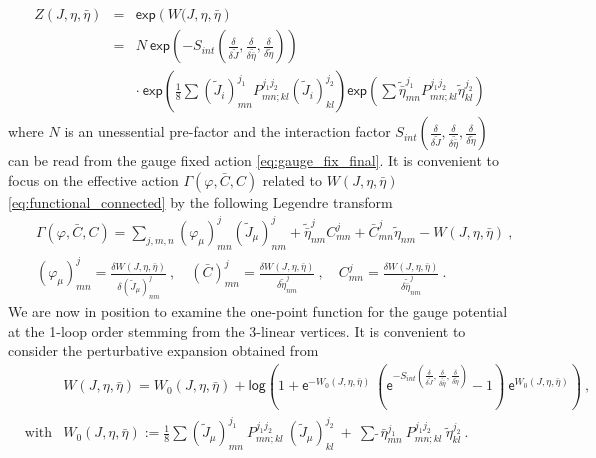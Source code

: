 \documentclass[11pt]{book}
\renewcommand{\exp}{\mathsf{exp}}
\renewcommand{\log}{\mathsf{log}}
\newcommand{\esf}{\mathsf{e}}
\theoremstyle{break}
\begin{document}
%
\begin{eqnarray}
Z(J,\eta,\bar\eta) 
&=& \exp\left(W(J,\eta,\bar\eta\right) \nonumber \\
&=& N \ \exp\left( - S_{int}\left( \frac{\delta}{\delta \widetilde{J}}, \frac{\delta}{\delta\widetilde{\bar{\eta}}}, \frac{\delta}{\delta\widetilde{\eta}} \right) \right) \nonumber \\
&& \cdot \ 
\exp\left( \frac{1}{8}\sum(\widetilde J_i)^{j_1}_{mn}P^{j_1 j_2}_{mn;kl} (\widetilde J_i)^{j_2}_{kl} \right)
\exp\left(\sum\widetilde{\bar\eta}^{j_1}_{mn}P^{j_1 j_2}_{mn;kl}\widetilde{\eta}^{j_2}_{kl} \right)
\label{eq:functional_connected}
\end{eqnarray}
%
where $N$ is an unessential pre-factor and the interaction factor $S_{int}\left(\frac{\delta}{\delta \widetilde J},\frac{\delta}{\delta\widetilde{\bar\eta}},\frac{\delta}{\delta\widetilde{\eta}}\right)$ can be read from the gauge fixed action \eqref{eq:gauge_fix_final}. It is convenient to focus on the effective action $\Gamma(\varphi, \bar C, C)$ related to $W(J,\eta,\bar\eta)$ \eqref{eq:functional_connected} by the following Legendre transform 
%
\begin{eqnarray}
&& 
\Gamma(\varphi, \bar{C}, C) =
\sum_{j,m,n} 
(\varphi_\mu)^j_{mn}(\widetilde{J}_\mu)^j_{nm} +
\widetilde{\bar\eta}^j_{nm}C^j_{mn} +
\bar C^j_{mn}\widetilde{\eta}_{nm}-W(J,\eta,\bar\eta) \ , 
\label{eq:legendre_1} \\
&& 
(\varphi_\mu)^j_{mn} = \frac{\delta W(J,\eta,\bar\eta)}{\delta(\widetilde{J}_\mu)^j_{nm}} \ , \quad 
(\bar{C})^j_{mn} = \frac{\delta W(J,\eta,\bar{\eta})}{\delta\widetilde{\eta}^j_{nm}} \ , \quad
C^j_{mn} = \frac{\delta W(J,\eta,\bar{\eta})}{\delta\widetilde{\bar{\eta}}^j_{nm}} \ .
\label{eq:legendre_2}
\end{eqnarray}
%
We are now in position to examine the one-point function for the gauge potential at the 1-loop order stemming from the 3-linear vertices. It is convenient to consider the perturbative expansion obtained from
%
\begin{eqnarray*}
&& 
W(J,\eta,\bar\eta) = W_0(J,\eta,\bar\eta) + \log\left( 1 + \esf^{-W_0(J,\eta,\bar\eta)} \ \left( \esf^{-S_{int}\left(\frac{\delta}{\delta \widetilde J},\frac{\delta}{\delta\widetilde{\bar\eta}},\frac{\delta}{\delta\widetilde{\eta}}\right)} - 1 \right) \ \esf^{W_0(J,\eta,\bar\eta)} \right) \ , \\
%
&\mbox{with}& 
W_0(J,\eta,\bar\eta) := \frac18 \sum (\widetilde J_\mu)^{j_1}_{mn} \ P^{j_1 j_2}_{mn;kl} \  (\widetilde J_\mu)^{j_2}_{kl} \ + \ \sum\widetilde \ \bar{\eta}^{j_1}_{mn} \ P^{j_1 j_2}_{mn;kl} \ \widetilde{\eta}^{j_2}_{kl} \ .
\end{eqnarray*}
\end{document}

